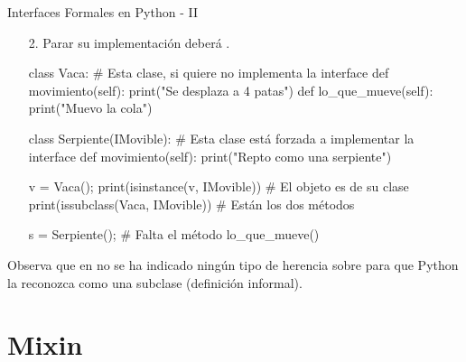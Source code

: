\documentclass[10pt, envcountsect , spanish]{beamer}
\begin{document}
\begin{frame}[fragile]{Interfaces Formales en Python - II} 
\begin{enumerate}

\item[2.] Parar  su  implementación deberá .

\scriptsize
\begin{pyconsole}[][frame=single, fontsize=\scriptsize]
class Vaca:     # Esta clase, si quiere no implementa la interface
    def movimiento(self):
        print("Se desplaza a 4 patas")
    def lo_que_mueve(self):
        print("Muevo la cola")


class Serpiente(IMovible):  # Esta clase está forzada a implementar la interface
    def movimiento(self):
        print("Repto como una serpiente")

v = Vaca();
print(isinstance(v, IMovible))  # El objeto es de su clase
print(issubclass(Vaca, IMovible)) # Están los dos métodos


s = Serpiente(); # Falta el método lo_que_mueve()
\end{pyconsole}
\end{enumerate}

\scriptsize

Observa que en  no se ha indicado ningún tipo de herencia sobre  para que Python la reconozca como una  subclase (definición informal).

\end{frame}



\section{Mixin}
\end{document}
